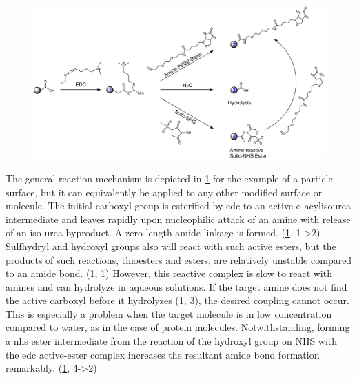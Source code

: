 \begin{figure}[htb!]
	\centering
	\includegraphics[width=\linewidth]{./Ressources/Chemistry/EDC-NHS.eps}
	\label{fig:chem:COOH-EDC-NHS}
\end{figure}
\clearpage
The general reaction mechanism is depicted in \cref{fig:chem:COOH-EDC-NHS} for the example of a particle surface, but it can equivalently be applied to any other modified surface or molecule. The initial \gls{carboxyl} group is esterified by \gls{edc} to an active o-acylisourea intermediate and leaves rapidly upon nucleophilic attack of an amine with release of an iso-urea byproduct. A zero-length amide linkage is formed. (\cref{fig:chem:COOH-EDC-NHS}, 1->2) Sulfhydryl and hydroxyl groups also will react with such active esters, but the products of such reactions, thioesters and esters, are relatively unstable compared to an \gls{amide} bond. (\cref{fig:chem:COOH-EDC-NHS}, 1)\cite{lit:bio:BioconjugateTechniques} \newline
However, this reactive complex is slow to react with amines and can hydrolyze in aqueous solutions. If the target amine does not find the active \gls{carboxyl} before it hydrolyzes (\cref{fig:chem:COOH-EDC-NHS}, 3), the desired coupling cannot occur. This is especially a problem when the target molecule is in low concentration compared to water, as in the case of protein molecules. Notwithstanding, forming a \gls{nhs} ester intermediate from the reaction of the \gls{hydroxyl} group on NHS with the \gls{edc} active-ester complex increases the resultant amide bond formation remarkably. (\cref{fig:chem:COOH-EDC-NHS}, 4->2) \cite{lit:chem:nhs2}

